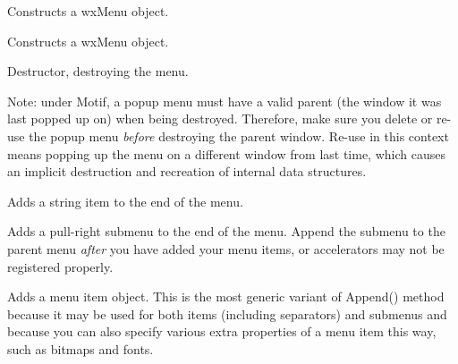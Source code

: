 Constructs a wxMenu object.





Constructs a wxMenu object.



\label{wxmenudtor}


Destructor, destroying the menu.

Note: under Motif, a popup menu must have a valid parent (the window
it was last popped up on) when being destroyed. Therefore, make sure
you delete or re-use the popup menu {\it before} destroying the
parent window. Re-use in this context means popping up the menu on
a different window from last time, which causes an implicit destruction
and recreation of internal data structures.

\label{wxmenuappend}


Adds a string item to the end of the menu.


Adds a pull-right submenu to the end of the menu. Append the submenu to the parent
menu {\it after} you have added your menu items, or accelerators may not be
registered properly.


Adds a menu item object. This is the most generic variant of Append() method
because it may be used for both items (including separators) and submenus and
because you can also specify various extra properties of a menu item this way,
such as bitmaps and fonts.

